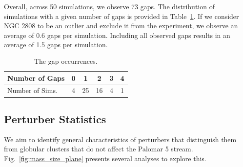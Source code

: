 \documentclass{aa}
\begin{document}
    Overall, across 50 simulations, we observe 73 gaps. The distribution of simulations with a given number of gaps is provided in Table~\ref{table:gap_distribution}.  If we consider NGC 2808 to be an outlier and exclude it from the experiment, we observe an average of 0.6 gaps per simulation. Including all observed gaps results in an average of 1.5 gaps per simulation.

    \begin{table}[h]
      \centering
        \begin{tabular}{|l|c|c|c|c|c|}
          \hline
          Number of Gaps & 0 & 1 & 2 & 3 & 4 \\
          \hline
          Number of Sims. & 4 & 25 & 16 & 4 & 1 \\
          \hline
        \end{tabular}
      \caption{The gap occurrences.}\label{table:gap_distribution}
    \end{table}
    


    

    



 
 \subsection*{Perturber Statistics}
  

    We aim to identify general characteristics of perturbers that distinguish them from globular clusters that do not affect the Palomar 5 stream. Fig.~\ref{fig:mass_size_plane} presents several analyses to explore this.
\end{document}
